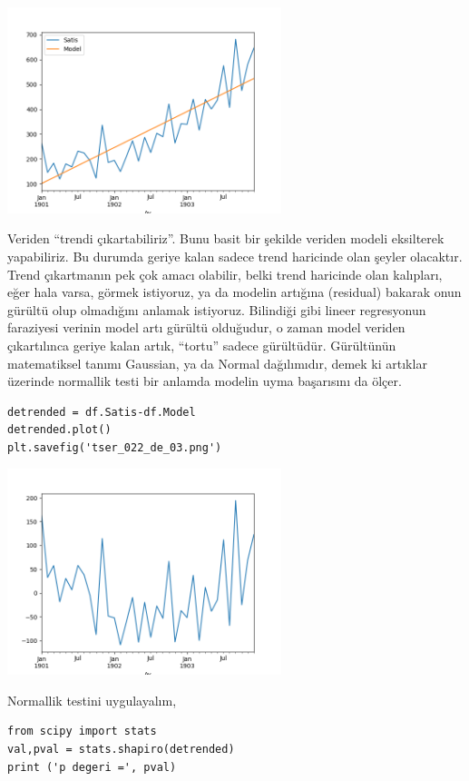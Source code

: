 \documentclass[12pt,fleqn]{article}\usepackage{../../common}
\begin{document}
\includegraphics[height=6cm]{tser_022_de_01.png}

Veriden ``trendi çıkartabiliriz''. Bunu basit bir şekilde veriden modeli
eksilterek yapabiliriz. Bu durumda geriye kalan sadece trend haricinde olan
şeyler olacaktır. Trend çıkartmanın pek çok amacı olabilir, belki trend
haricinde olan kalıpları, eğer hala varsa, görmek istiyoruz, ya da modelin
artığına (residual) bakarak onun gürültü olup olmadığını anlamak
istiyoruz. Bilindiği gibi lineer regresyonun faraziyesi verinin model artı
gürültü olduğudur, o zaman model veriden çıkartılınca geriye kalan artık,
``tortu'' sadece gürültüdür. Gürültünün matematiksel tanımı Gaussian, ya da
Normal dağılımıdır, demek ki artıklar üzerinde normallik testi bir anlamda
modelin uyma başarısını da ölçer.

\begin{verbatim}
detrended = df.Satis-df.Model
detrended.plot()
plt.savefig('tser_022_de_03.png')
\end{verbatim}

\includegraphics[height=6cm]{tser_022_de_03.png}

Normallik testini uygulayalım,

\begin{verbatim}
from scipy import stats
val,pval = stats.shapiro(detrended)
print ('p degeri =', pval)
\end{verbatim}
\end{document}
